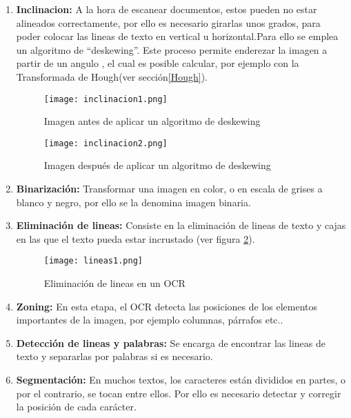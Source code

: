 \begin{enumerate}
	\item \textbf{Inclinacion:} \label{deskewing} A la hora de escanear documentos, estos pueden no estar alineados correctamente, por ello es necesario girarlas unos grados, para poder colocar las lineas de texto en vertical u horizontal.Para ello se emplea un algoritmo de “deskewing”.
	Este proceso permite enderezar la imagen a partir de un angulo , el cual es posible calcular, por ejemplo con la Transformada de Hough(ver sección\ref{Hough}).
	
	\begin{figure}[ht]
		\centering
		\begin{minipage}[b]{0.45\linewidth}
			\texttt{[image: inclinacion1.png]}
			\caption{Imagen antes de aplicar un algoritmo de deskewing }
			\label{fig:minipage1}
	\end{minipage}
	\quad
	\begin{minipage}[b]{0.45\linewidth}
		\texttt{[image: inclinacion2.png]}
		\caption{Imagen después de aplicar un algoritmo de deskewing}
		\label{fig:minipage2}
		\end{minipage}
	\end{figure}

	\item \textbf{Binarización:} Transformar una imagen en color, o en escala de grises a blanco y negro, por ello se la denomina imagen binaria.
	
	\item \textbf{Eliminación de lineas:} Consiste en la eliminación de lineas de texto y cajas en las que el texto pueda estar incrustado (ver figura \ref{fig:lineas}).
	\begin{figure}[ht]
		\centering
		\begin{minipage}[b]{0.45\linewidth}
			\texttt{[image: lineas1.png]}
			\caption{Eliminación de lineas en un OCR}
			\label{fig:lineas}
	\end{minipage}
	\end{figure}
	\item \textbf{Zoning:} En esta etapa, el OCR detecta las posiciones de los elementos importantes de la imagen, por ejemplo columnas, párrafos etc..
	\item \textbf{Detección de lineas y palabras:} Se encarga de encontrar las lineas de texto y separarlas por palabras si es necesario.
	\item \textbf{Segmentación:} En muchos textos, los caracteres están divididos en partes, o por el contrario, se tocan entre ellos.
	Por ello es necesario detectar y corregir la posición de cada carácter.
\end{enumerate}

